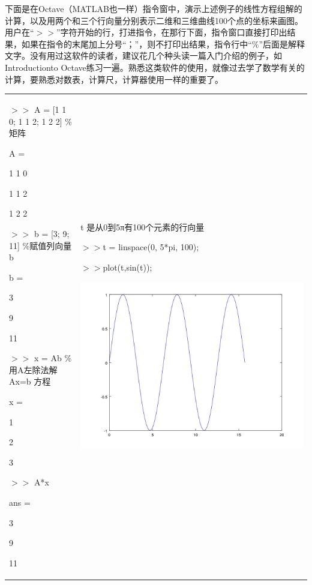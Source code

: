 下面是在Octave（MATLAB也一样）指令窗中，演示上述例子的线性方程组解的计算，以及用两个和三个行向量分别表示二维和三维曲线100个点的坐标来画图。用户在``$ >> $''字符开始的行，打进指令，在那行下面，指令窗口直接打印出结果，如果在指令的末尾加上分号``；''，则不打印出结果，指令行中``\%''后面是解释文字。没有用过这软件的读者，建议花几个种头读一篇入门介绍的例子，如Introductionto Octave练习一遍。熟悉这类软件的使用，就像过去学了数学有关的计算，要熟悉对数表，计算尺，计算器使用一样的重要了。
\begin{table}[htbp]
	\setlength{\abovecaptionskip}{0.cm}%
	\centering
	\setlength{\tabcolsep}{2pt}
	
\begin{tabular}{|p{170 pt}|p{170 pt}|}

	\hline
	$ >> $ A = [1 1 0;  1 1 2; 1 2 2] \%矩阵
	
	A =
	
	1    1   0
	
	1    1   2
	
	1    2   2
	
	$ >> $ b = [3;  9; 11]  \%赋值列向量 b
	
	b =
	
	3
	
	9
	
	11
	
	$ >> $ x = Ab  \%用A左除法解 Ax=b 方程
	
	x =
	
	1
	
	2
	
	3
	
	$ >> $ A*x  %
	
	ans =
	
	3
	
	9
	
	11
	
	&
	
	t 是从0到5π有100个元素的行向量
	
	$ >> $t =  linspace(0, 5*pi, 100);  
	
	$ >> $plot(t,sin(t));                   
	
	\includegraphics[width = .4\textwidth]{pic/154012hzzaaow33s7a7kst.jpg}
	

\end{tabular}
\end{table}
